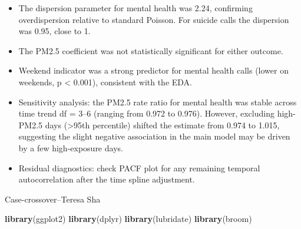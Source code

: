\documentclass[
]{article}
\newenvironment{Shaded}{\begin{snugshade}}{\end{snugshade}}
\newcommand{\FunctionTok}[1]{\textcolor[rgb]{0.13,0.29,0.53}{\textbf{#1}}}
\newcommand{\NormalTok}[1]{#1}
\providecommand{\tightlist}{%
  \setlength{\itemsep}{0pt}\setlength{\parskip}{0pt}}
\begin{document}
\begin{itemize}
\tightlist
\item
  The dispersion parameter for mental health was 2.24, confirming
  overdispersion relative to standard Poisson. For suicide calls the
  dispersion was 0.95, close to 1.
\item
  The PM2.5 coefficient was not statistically significant for either
  outcome.
\item
  Weekend indicator was a strong predictor for mental health calls
  (lower on weekends, p \textless{} 0.001), consistent with the EDA.
\item
  Sensitivity analysis: the PM2.5 rate ratio for mental health was
  stable across time trend df = 3--6 (ranging from 0.972 to 0.976).
  However, excluding high-PM2.5 days (\textgreater95th percentile)
  shifted the estimate from 0.974 to 1.015, suggesting the slight
  negative association in the main model may be driven by a few
  high-exposure days.
\item
  Residual diagnostics: check PACF plot for any remaining temporal
  autocorrelation after the time spline adjustment.
\end{itemize}

Case-crossover--Teresa Sha

\begin{Shaded}
\begin{Highlighting}[]
\FunctionTok{library}\NormalTok{(ggplot2)}
\FunctionTok{library}\NormalTok{(dplyr)}
\FunctionTok{library}\NormalTok{(lubridate)}
\FunctionTok{library}\NormalTok{(broom)}
\end{Highlighting}
\end{Shaded}
\end{document}

